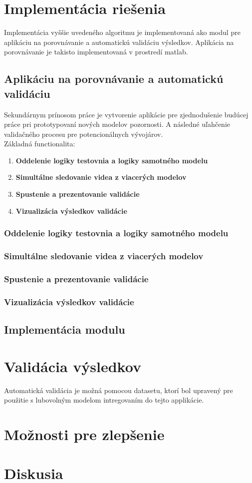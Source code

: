 \section{Implementácia riešenia}
Implementácia vyššie uvedeného algoritmu je implementovaná ako modul pre aplikáciu na porovnávanie a  automatickú validáciu výsledkov.
Aplikácia na porovnávanie je takisto implementovaná v prostredí matlab.

\subsection{Aplikáciu na porovnávanie a automatickú validáciu}
Sekundárnym prínosom práce je vytvorenie aplikácie pre zjednodušenie budúcej práce pri prototypovaní nových modelov pozornosti.
A následné uľahčenie validačného procesu pre potencionálnych vývojárov.\\
Základná functionalita:
\begin{enumerate}
  \item\textbf{Oddelenie logiky testovnia a logiky samotného modelu}
  \item\textbf{Simultálne sledovanie videa z viacerých modelov}
  \item\textbf{Spustenie a prezentovanie validácie}
  \item\textbf{Vizualizácia výsledkov validácie}
\end{enumerate}

\subsubsection{Oddelenie logiky testovnia a logiky samotného modelu}
\subsubsection{Simultálne sledovanie videa z viacerých modelov}
\subsubsection{Spustenie a prezentovanie validácie}
\subsubsection{Vizualizácia výsledkov validácie}

\subsection{Implementácia modulu}

\section{Validácia výsledkov}
Automatická validácia je možná pomocou datasetu\cite{accv}, ktorí bol upravený pre použitie s lubovolným modelom intregovaním do tejto applikácie.
\section{Možnosti pre zlepšenie}
\section{Diskusia}
